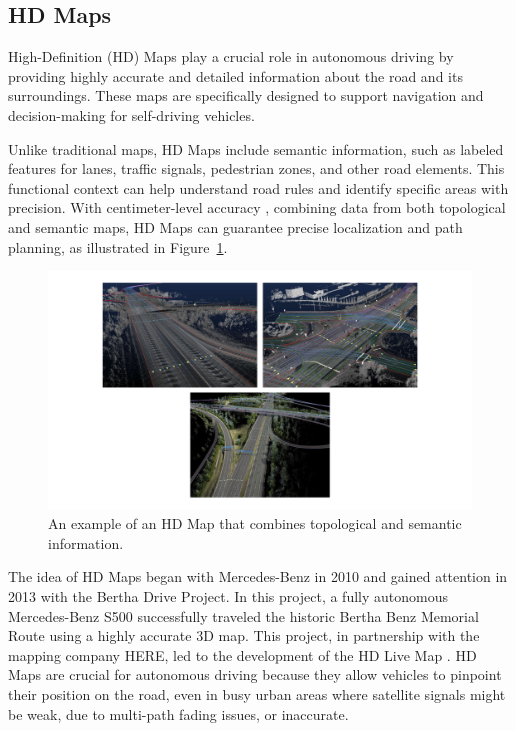 \subsection{HD Maps}
High-Definition (HD) Maps play a crucial role in autonomous driving by providing highly accurate and detailed information about the road and its surroundings. These maps are specifically designed to support navigation and decision-making for self-driving vehicles.

Unlike traditional maps, HD Maps include semantic information, such as labeled features for lanes, traffic signals, pedestrian zones, and other road elements. This functional context can help understand road rules and identify specific areas with precision. With centimeter-level accuracy \cite{geospatialworld_hd_maps}, combining data from both topological and semantic maps, HD Maps can guarantee precise localization and path planning, as illustrated in Figure~\ref{fig:hd_map}.
\begin{figure}[H]
    \centering
    \includegraphics[width=1\linewidth]{LateX//figs/CAP1_MERGE_HD_MAP_compressed.pdf}
    \caption{An example of an HD Map that combines topological and semantic information.}
    \label{fig:hd_map}
\end{figure}

The idea of HD Maps began with Mercedes-Benz in 2010 and gained attention in 2013 with the Bertha Drive Project. In this project, a fully autonomous Mercedes-Benz S500 successfully traveled the historic Bertha Benz Memorial Route using a highly accurate 3D map. This project, in partnership with the mapping company HERE, led to the development of the HD Live Map \cite{8105770}.
HD Maps are crucial for autonomous driving because they allow vehicles to pinpoint their position on the road, even in busy urban areas where satellite signals might be weak, due to multi-path fading issues, or inaccurate.

